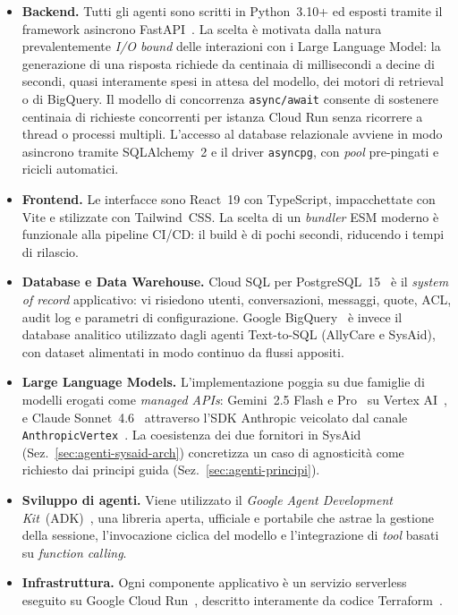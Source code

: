 \begin{itemize}
  \item \textbf{Backend.} Tutti gli agenti sono scritti in Python~3.10+ ed
        esposti tramite il framework asincrono FastAPI~\cite{fastapi_docs}. 
        La scelta è motivata
        dalla natura prevalentemente \emph{I/O bound} delle interazioni con i
        Large Language Model: la generazione di una risposta richiede da
        centinaia di millisecondi a decine di secondi, quasi interamente spesi
        in attesa del modello, dei motori di retrieval o di BigQuery. Il modello
        di concorrenza \texttt{async/await} consente di sostenere centinaia di
        richieste concorrenti per istanza Cloud Run senza ricorrere a
        thread o processi multipli. L'accesso al database relazionale avviene
        in modo asincrono tramite SQLAlchemy~2 e il driver
        \texttt{asyncpg}, con \emph{pool} pre-pingati e ricicli automatici.
  \item \textbf{Frontend.} Le interfacce sono React~19 con TypeScript,
        impacchettate con Vite e stilizzate con Tailwind~CSS. La scelta
        di un \emph{bundler} ESM moderno è funzionale alla pipeline CI/CD:
        il build è di pochi secondi, riducendo i tempi di rilascio.
  \item \textbf{Database e Data Warehouse.} Cloud SQL per
        PostgreSQL~15~\cite{gcp_cloudsql} è il \emph{system of record}
        applicativo: vi risiedono utenti, conversazioni, messaggi, quote,
        ACL, audit log e parametri di configurazione. Google
        BigQuery~\cite{gcp_bigquery} è invece il database analitico
        utilizzato dagli agenti Text-to-SQL (AllyCare e SysAid), con
        dataset alimentati in modo continuo da flussi appositi.
  \item \textbf{Large Language Models.} L'implementazione poggia su due
        famiglie di modelli erogati come \emph{managed APIs}: Gemini~2.5
        Flash e Pro~\cite{team2024gemini} su Vertex AI~\cite{gcp_vertexai},
        e Claude Sonnet~4.6~\cite{anthropic2024claude}
        attraverso l'SDK Anthropic veicolato dal canale
        \texttt{AnthropicVertex}~\cite{anthropic_docs}. La coesistenza
        dei due fornitori in SysAid (Sez.~\ref{sec:agenti-sysaid-arch})
        concretizza un caso di agnosticità come richiesto dai principi
        guida (Sez.~\ref{sec:agenti-principi}).
  \item \textbf{Sviluppo di agenti.} Viene utilizzato il \emph{Google Agent
        Development Kit}~(ADK)~\cite{google_adk_docs}, una libreria aperta,
        ufficiale e portabile che astrae la gestione della sessione, l'invocazione
        ciclica del modello e l'integrazione di \emph{tool} basati su
        \emph{function calling}.
 \item \textbf{Infrastruttura.} Ogni componente applicativo è un servizio
        serverless eseguito su Google Cloud Run~\cite{gcp_cloudrun},
        descritto interamente da codice Terraform~\cite{terraform_docs}.
\end{itemize}

